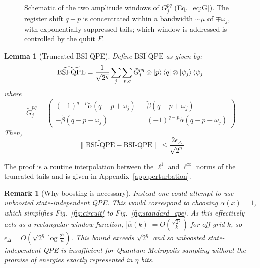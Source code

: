 \documentclass[aps,floatfix,10pt,amssymb,amsfont,amsmath,superscriptaddress,float,nofootinbib,longbibliography,nobalancelastpage,twocolumn]{revtex4-2}
\newtheorem{lemma}{Lemma}
\newtheorem{remark}{Remark}
\begin{document}
\begin{figure}
    \centering
{}
    \caption{Schematic of the two amplitude windows of $G^{pq}_j$ (Eq.~\ref{eq:G}). The register shift $q-p$ is concentrated within a bandwidth $\sim\mu$ of $\mp\omega_j$, with exponentially suppressed tails; which window is addressed is controlled by the qubit $F$.}
    \label{fig:windowcartoon}
\end{figure}
\begin{lemma}[Truncated BSI-QPE]
\label{lemma:0}
    Define $\widetilde{\text{BSI-QPE}}$ as given by:
    \begin{equation}
       \widetilde{\text{BSI-QPE}}= \frac{1}{\sqrt{2^{\eta}}}\sum_j \sum_{p,q} \tilde G^{pq}_j \otimes \ket{p}\bra{q} \otimes \ket{\psi_j}\bra{\psi_j}
    \end{equation}
    where 
    \begin{equation}
        \tilde G^{pq}_j = \begin{pmatrix}
        (-1)^{q-p}\tilde\alpha(q-p+\omega_{j}) && \tilde\beta(q-p+\omega_{j})\\
        -\tilde\beta (q-p-\omega_{j}) && (-1)^{q-p}\tilde\alpha(q-p-\omega_{j})
    \end{pmatrix}
    \end{equation}
    Then,  
    \begin{equation}
        \|\widetilde{\text{BSI-QPE}}-\text{BSI-QPE}\| \leq \frac{2\epsilon_{\Delta}}{\sqrt{2^{\eta}}}
    \end{equation}
\end{lemma}
The proof is a routine interpolation between the $\ell^1$ and $\ell^{\infty}$ norms of the truncated tails and is given in Appendix~\ref{app:perturbation}.
\begin{remark}[Why boosting is necessary]
Instead one could attempt to use unboosted state-independent QPE. This would correspond to choosing $\alpha(x)=1$, which simplifies Fig.~\ref{fig:circuit} to Fig.~\ref{fig:standard_qpe}. As this effectively acts as a rectangular window function, $|\hat\alpha(k)| = O(\frac{\sqrt{2^{\eta}}}{k})$ for off-grid $k$, so $\epsilon_{\Delta} = O(\sqrt{2^{\eta}}\log \frac{2^\eta}{\mu})$. This bound exceeds $\sqrt{2^{\eta}}$ and so unboosted state-independent QPE is insufficient for Quantum Metropolis sampling without the promise of energies exactly represented in $\eta$ bits.
\end{remark}
\end{document}
